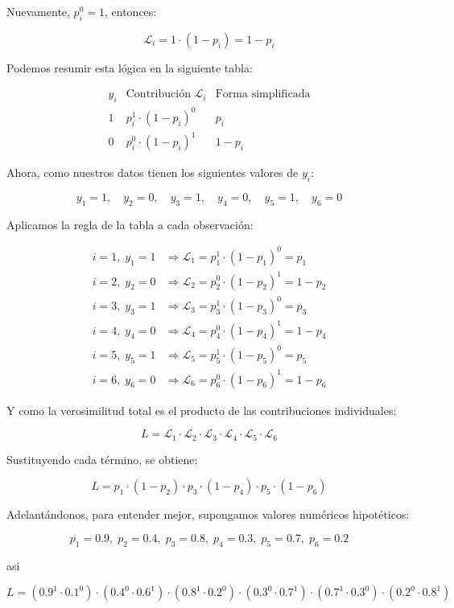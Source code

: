 \documentclass[12pt]{article}
\begin{document}
Nuevamente, $p_i^{0} = 1$, entonces:

\[
\mathcal{L}_i = 1 \cdot (1-p_i) = 1-p_i
\]


Podemos resumir esta lógica en la siguiente tabla:

\[
\begin{array}{c|c|c}
y_i & \text{Contribución } \mathcal{L}_i & \text{Forma simplificada} \\
\hline
1 & p_i^{1} \cdot (1-p_i)^{0} & p_i \\
0 & p_i^{0} \cdot (1-p_i)^{1} & 1-p_i
\end{array}
\]

Ahora, como nuestros datos tienen los siguientes valores de $y_i$:

\[
y_1 = 1, \quad y_2 = 0, \quad y_3 = 1, \quad y_4 = 0, \quad y_5 = 1, \quad y_6 = 0
\]

Aplicamos la regla de la tabla a cada observación:

\begin{align*}
i=1,\; y_1=1 &\Rightarrow \mathcal{L}_1 = p_1^{1} \cdot (1-p_1)^{0} = p_1 \\
i=2,\; y_2=0 &\Rightarrow \mathcal{L}_2 = p_2^{0} \cdot (1-p_2)^{1} = 1-p_2 \\
i=3,\; y_3=1 &\Rightarrow \mathcal{L}_3 = p_3^{1} \cdot (1-p_3)^{0} = p_3 \\
i=4,\; y_4=0 &\Rightarrow \mathcal{L}_4 = p_4^{0} \cdot (1-p_4)^{1} = 1-p_4 \\
i=5,\; y_5=1 &\Rightarrow \mathcal{L}_5 = p_5^{1} \cdot (1-p_5)^{0} = p_5 \\
i=6,\; y_6=0 &\Rightarrow \mathcal{L}_6 = p_6^{0} \cdot (1-p_6)^{1} = 1-p_6
\end{align*}

Y como la verosimilitud total es el producto de las contribuciones individuales:

\[
L = \mathcal{L}_1 \cdot \mathcal{L}_2 \cdot \mathcal{L}_3 \cdot \mathcal{L}_4 \cdot \mathcal{L}_5 \cdot \mathcal{L}_6
\]

Sustituyendo cada término, se obtiene:

\[
L = p_1 \cdot (1-p_2) \cdot p_3 \cdot (1-p_4) \cdot p_5 \cdot (1-p_6)
\]

Adelantándonos, para entender mejor, supongamos valores numéricos hipotéticos:

\[
p_1 = 0.9,\; p_2 = 0.4,\; p_3 = 0.8,\; p_4 = 0.3,\; p_5 = 0.7,\; p_6 = 0.2
\]

asi

\[
L = (0.9^{1} \cdot 0.1^{0}) \cdot (0.4^{0} \cdot 0.6^{1}) \cdot (0.8^{1} \cdot 0.2^{0}) \cdot (0.3^{0} \cdot 0.7^{1}) \cdot (0.7^{1} \cdot 0.3^{0}) \cdot (0.2^{0} \cdot 0.8^{1})
\]
\end{document}
